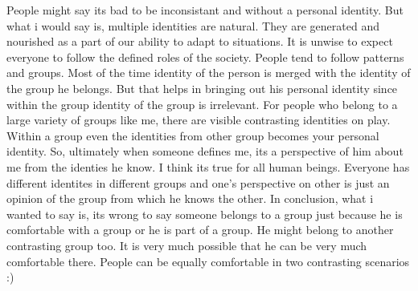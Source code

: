 People might say its bad to be inconsistant and without a personal identity. But what i would say is, multiple identities are natural. They are generated and nourished as a part of our ability to adapt to situations. It is unwise to expect everyone to follow the defined roles of the society. People tend to follow patterns and groups. Most of the time identity of the person is merged with the identity of the group he belongs. But that helps in bringing out his personal identity since within the group identity of the group is irrelevant. For people who belong to a large variety of groups like me, there are visible contrasting identities on play. Within a group even the identities from other group becomes your personal identity. So, ultimately when someone defines me, its a perspective of him about me from the identies he know. I think its true for all human beings. Everyone has different identites in different groups and one's perspective on other is just an opinion of the group from which he knows the other. In conclusion, what i wanted to say is, its wrong to say someone belongs to a group just because he is comfortable with a group or he is part of a group. He might belong to another contrasting group too. It is very much possible that he can be very much comfortable there. People can be equally comfortable in two contrasting scenarios :)

\newpage 
